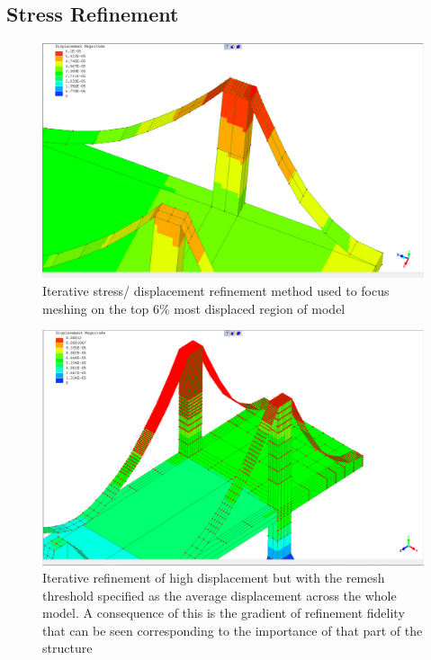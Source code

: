 \subsection{Stress Refinement}
\begin{figure}[H]
  \centerline{\includegraphics[width=165mm, scale=0.5]{../Graphics/BridgeCrossLoading/the90thPercentileRefinement.png}}
  \caption{Iterative stress/ displacement refinement method used to focus meshing on the top 6\% most displaced region of model}
\end{figure}

\begin{figure}[H]
  \centerline{\includegraphics[width=165mm, scale=0.5]{../Graphics/BridgeCrossLoading/aboveAverageRefinement2.png}}
  \caption{Iterative refinement of high displacement but with the remesh threshold specified as the average displacement across the whole model. A consequence of this is the gradient of refinement fidelity that can be seen corresponding to the importance of that part of the structure}
\end{figure}


